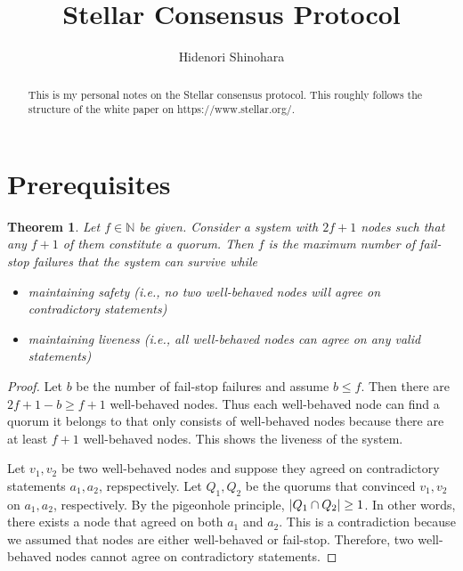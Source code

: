 \documentclass[12pt, psamsfonts]{amsart}
\newtheorem{thm}{Theorem}[section]
\theoremstyle{definition}
\theoremstyle{remark}
\numberwithin{equation}{section}
\begin{document}
\title{Stellar Consensus Protocol}
\author{Hidenori Shinohara}

\begin{abstract}
    This is my personal notes on the Stellar consensus protocol.
    This roughly follows the structure of the white paper on https://www.stellar.org/.
\end{abstract}

\maketitle

\tableofcontents

\section{Prerequisites}

\begin{thm}
    Let $f \in \mathbb{N}$ be given.
    Consider a system with $2f + 1$ nodes such that any $f + 1$ of them constitute a quorum.
    Then $f$ is the maximum number of fail-stop failures that the system can survive while
    \begin{itemize}
        \item
            maintaining safety (i.e., no two well-behaved nodes will agree on contradictory statements)
        \item
            maintaining liveness (i.e., all well-behaved nodes can agree on any valid statements)
    \end{itemize}
\end{thm}

\begin{proof}
    Let $b$ be the number of fail-stop failures and assume $b \leq f$.
    Then there are $2f + 1 - b \geq f + 1$ well-behaved nodes.
    Thus each well-behaved node can find a quorum it belongs to that only consists of well-behaved nodes because there are at least $f + 1$ well-behaved nodes.
    This shows the liveness of the system.

    Let $v_1, v_2$ be two well-behaved nodes and suppose they agreed on contradictory statements $a_1, a_2$, repspectively.
    Let $Q_1, Q_2$ be the quorums that convinced $v_1, v_2$ on $a_1, a_2$, respectively.
    By the pigeonhole principle, $\abs{Q_1 \cap Q_2} \geq 1$.
    In other words, there exists a node that agreed on both $a_1$ and $a_2$.
    This is a contradiction because we assumed that nodes are either well-behaved or fail-stop.
    Therefore, two well-behaved nodes cannot agree on contradictory statements.
\end{proof}
\end{document}
